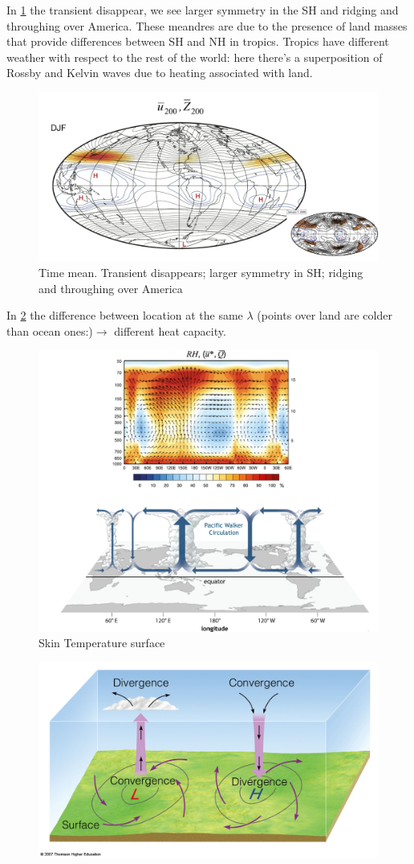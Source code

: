 In \ref{fig:time mean} the transient disappear, we see larger symmetry in the SH and ridging and throughing over America. These meandres are due to the presence of land masses that provide differences between SH and NH in tropics. Tropics have different weather with respect to the rest of the world: here there's a superposition of Rossby and Kelvin waves due to heating associated with land. 
\begin{figure}[h]
    \centering
    \includegraphics[width=0.65\linewidth]{uploads/time mean.png}
    \caption{Time mean. Transient disappears; larger symmetry in SH; ridging and throughing over America}
    \label{fig:time mean}
\end{figure}
In \ref{fig:skewT} the difference between location at the same $\lambda$ (points over land are colder than ocean ones:)$\rightarrow$ different heat capacity. 
\begin{figure}[h]
    \centering
    \includegraphics[width=0.5\linewidth]{uploads/sket T surface.png}
    \caption{Skin Temperature surface}
    \label{fig:skewT}
\end{figure}
\begin{figure} %
    \centering
    \includegraphics[width=0.59\linewidth]{uploads/H and L.png}
    \label{fig:HL}
\end{figure}
